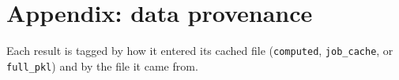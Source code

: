 \documentclass[11pt]{article}
\begin{document}
\section*{Appendix: data provenance}
Each result is tagged by how it entered its cached file (\texttt{computed}, \texttt{job\_cache}, or \texttt{full\_pkl}) and by the file it came from.
\begin{table}[H]\centering
\caption{Provenance of each stored result.}

\end{table}
\end{document}
